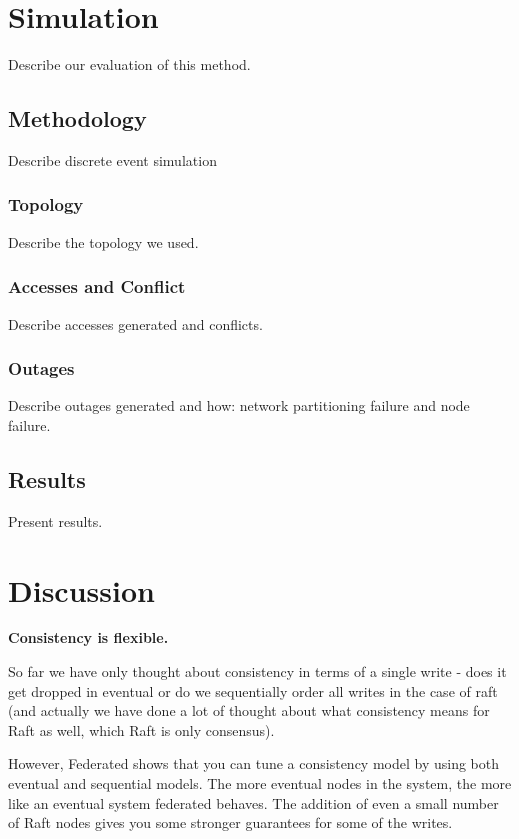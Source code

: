 \documentclass[letterpaper,twocolumn,10pt]{article}
\begin{document}
\section{Simulation}

Describe our evaluation of this method.

\subsection{Methodology}

Describe discrete event simulation

\subsubsection{Topology}

Describe the topology we used.

\subsubsection{Accesses and Conflict}

Describe accesses generated and conflicts.

\subsubsection{Outages}

Describe outages generated and how: network partitioning failure and node failure.

\subsection{Results}

Present results.

\section{Discussion}

\textbf{Consistency is flexible.}

So far we have only thought about consistency in terms of a single write - does it get dropped in eventual or do we sequentially order all writes in the case of raft (and actually we have done a lot of thought about what consistency means for Raft as well, which Raft is only consensus).

However, Federated shows that you can tune a consistency model by using both eventual and sequential models. The more eventual nodes in the system, the more like an eventual system federated behaves. The addition of even a small number of Raft nodes gives you some stronger guarantees  for some of the writes.
\end{document}
